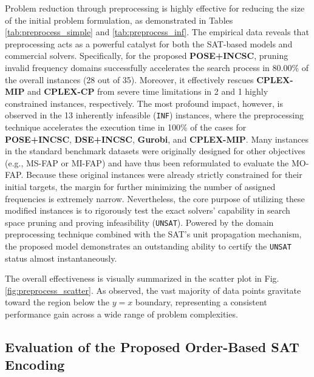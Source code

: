 \documentclass[letterpaper,journal]{IEEEtran}
\begin{document}
Problem reduction through preprocessing is highly effective for reducing the size of the initial problem formulation, as demonstrated in Tables \ref{tab:preprocess_simple} and \ref{tab:preprocess_inf}. 
The empirical data reveals that preprocessing acts as a powerful catalyst for both the SAT-based models and commercial solvers. 
Specifically, for the proposed \textbf{POSE+INCSC}, pruning invalid frequency domains successfully accelerates the search process in 80.00\% of the overall instances (28 out of 35). 
Moreover, it effectively rescues \textbf{CPLEX-MIP} and \textbf{CPLEX-CP} from severe time limitations in 2 and 1 highly constrained instances, respectively. 
The most profound impact, however, is observed in the 13 inherently infeasible (\texttt{INF}) instances, where the preprocessing technique accelerates the execution time in 100\% of the cases for \textbf{POSE+INCSC}, \textbf{DSE+INCSC}, \textbf{Gurobi}, and \textbf{CPLEX-MIP}. 
Many instances in the standard benchmark datasets were originally designed for other objectives (e.g., MS-FAP or MI-FAP) and have thus been reformulated to evaluate the MO-FAP. Because these original instances were already strictly constrained for their initial targets, the margin for further minimizing the number of assigned frequencies is extremely narrow. Nevertheless, the core purpose of utilizing these modified instances is to rigorously test the exact solvers' capability in search space pruning and proving infeasibility (\texttt{UNSAT}). Powered by the domain preprocessing technique combined with the SAT's unit propagation mechanism, the proposed model demonstrates an outstanding ability to certify the \texttt{UNSAT} status almost instantaneously.

The overall effectiveness is visually summarized in the scatter plot in Fig. \ref{fig:preprocess_scatter}. As observed, the vast majority of data points gravitate toward the region below the $y=x$ boundary, representing a consistent performance gain across a wide range of problem complexities.

\subsection{Evaluation of the Proposed Order-Based SAT Encoding}
\end{document}
